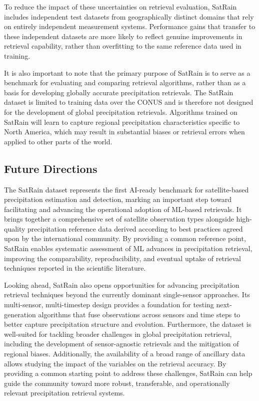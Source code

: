 \documentclass[11pt]{article}
\begin{document}
To reduce the impact of these uncertainties on retrieval evaluation, SatRain
includes independent test datasets from geographically distinct domains that
rely on entirely independent measurement systems. Performance gains that
transfer to these independent datasets are more likely to reflect genuine
improvements in retrieval capability, rather than overfitting to the same
reference data used in training.

It is also important to note that the primary purpose of SatRain is to serve as
a benchmark for evaluating and comparing retrieval algorithms, rather than as a
basis for developing globally accurate precipitation retrievals. The SatRain
dataset is limited to training data over the CONUS and is therefore not designed
for the development of global precipitation retrievals. Algorithms trained on
SatRain will learn to capture regional precipitation characteristics specific to
North America, which may result in substantial biases or retrieval errors when
applied to other parts of the world.

\subsection{Future Directions}

The SatRain dataset represents the first AI-ready benchmark for satellite-based
precipitation estimation and detection, marking an important step toward
facilitating and advancing the operational adoption of ML-based retrievals. It
brings together a comprehensive set of satellite observation types alongside
high-quality precipitation reference data derived according to best practices
agreed upon by the international community. By providing a common reference
point, SatRain enables systematic assessment of ML advances in precipitation
retrieval, improving the comparability, reproducibility, and eventual uptake of
retrieval techniques reported in the scientific literature.

Looking ahead, SatRain also opens opportunities for advancing precipitation
retrieval techniques beyond the currently dominant single-sensor approaches. Its
multi-sensor, multi-timestep design provides a foundation for testing
next-generation algorithms that fuse observations across sensors and time steps
to better capture precipitation structure and evolution. Furthermore, the
dataset is well-suited for tackling broader challenges in global
precipitation retrieval, including the development of sensor-agnostic retrievals
and the mitigation of regional biases. Additionally, the availability of a broad
range of ancillary data allows studying the impact of the variables on the
retrieval accuracy. By providing a common starting point to address these
challenges, SatRain can help guide the community toward more robust,
transferable, and operationally relevant precipitation retrieval systems.
\end{document}
